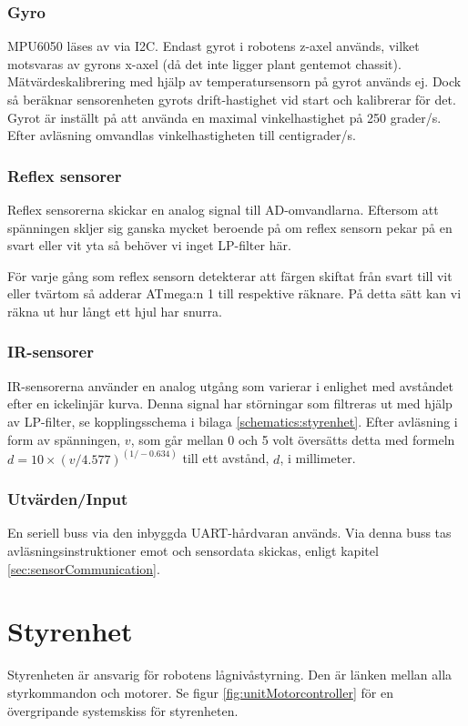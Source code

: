 \documentclass[a4paper,11pt]{article}
\begin{document}
\clearpage

\subsubsection{Gyro}
MPU6050 läses av via I2C. Endast gyrot i robotens z-axel används, vilket motsvaras av gyrons x-axel (då det inte ligger plant gentemot chassit). Mätvärdeskalibrering med hjälp av temperatursensorn på gyrot används ej. Dock så beräknar sensorenheten gyrots drift-hastighet vid start och kalibrerar för det. Gyrot är inställt på att använda en maximal vinkelhastighet på 250 grader/s. Efter avläsning omvandlas vinkelhastigheten till centigrader/s.

\subsubsection{Reflex sensorer}
Reflex sensorerna skickar en analog signal till AD-omvandlarna. Eftersom att spänningen skljer sig ganska mycket beroende på om reflex sensorn pekar på en svart eller vit yta så behöver vi inget LP-filter här.

För varje gång som reflex sensorn detekterar att färgen skiftat från svart till vit eller tvärtom så adderar ATmega:n 1 till respektive räknare. På detta sätt kan vi räkna ut hur långt ett hjul har snurra.

\subsubsection{IR-sensorer}
IR-sensorerna använder en analog utgång som varierar i enlighet med avståndet efter en ickelinjär kurva. Denna signal har störningar som filtreras ut med hjälp av LP-filter, se kopplingsschema i bilaga \ref{schematics:styrenhet}. Efter avläsning i form av spänningen, $v$, som går mellan 0 och 5 volt översätts detta med formeln $d = 10 \times (v/4.577) ^{(1/-0.634)}$ till ett avstånd, $d$, i millimeter.

\subsubsection{Utvärden/Input}
En seriell buss via den inbyggda UART-hårdvaran används. Via denna buss tas avläsningsinstruktioner emot och sensordata skickas, enligt kapitel \ref{sec:sensorCommunication}.

\clearpage
\section{Styrenhet} \label{sec:system2}
Styrenheten är ansvarig för robotens lågnivåstyrning. Den är länken mellan alla styrkommandon och motorer. Se figur \ref{fig:unitMotorcontroller} för en övergripande systemskiss för styrenheten.
\end{document}
